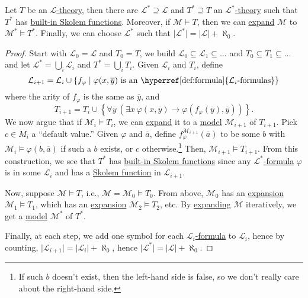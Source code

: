 \begin{lemma}\label{lma:Skolemization}
	Let \(T\) be an \hyperref[def:theory]{\(\mathcal{L} \)-theory}, then there are \(\mathcal{L} ^{\ast} \supseteq \mathcal{L} \) and \(T^{\ast} \supseteq T\) an \hyperref[def:theory]{\(\mathcal{L} ^{\ast} \)-theory} such that \(T^{\ast} \) has \hyperref[def:built-in-Skolem-function]{built-in Skolem functions}. Moreover, if \(\mathcal{M} \models T\), then we can \hyperref[not:expansion]{expand} \(\mathcal{M} \) to \(\mathcal{M} ^{\ast} \models T^{\ast} \). Finally, we can choose \(\mathcal{L} ^{\ast} \) such that \(\vert \mathcal{L} ^{\ast} \vert = \vert \mathcal{L} \vert + \aleph_0\).
\end{lemma}
\begin{proof}
	Start with \(\mathcal{L} _0 = \mathcal{L} \) and \(T_0 = T\), we build \(\mathcal{L} _0 \subseteq \mathcal{L} _1 \subseteq \ldots \) and \(T_0 \subseteq T_1 \subseteq \ldots \) and let \(\mathcal{L} ^{\ast} = \bigcup_{i} \mathcal{L} _i\) and \(T^{\ast} = \bigcup_{i} T_i\). Given \(\mathcal{L} _i\) and \(T_i\), define
	\[
		\mathcal{L} _{i+1} = \mathcal{L} _i \cup \left\{ f_\varphi \mid \varphi (x, \overline{y} ) \text{ is an \hyperref[def:formula]{\(\mathcal{L} _i \)-formulas}} \right\}
	\]
	where the arity of \(f_\varphi \) is the same as \(\overline{y} \), and
	\[
		T_{i+1} = T_i \cup \left\{ \forall \overline{y} \ (\exists x\ \varphi (x, \overline{y} ) \to \varphi (f_\varphi (\overline{y} ) , \overline{y} ) ) \right\}.
	\]
	We now argue that if \(\mathcal{M}_i \models T_i\), we can \hyperref[not:expansion]{expand} it to a \hyperref[def:model]{model} \(\mathcal{M} _{i+1} \) of \(T_{i+1} \). Pick \(c\in M_i\) a ``default value.'' Given \(\varphi \) and \(\overline{a} \), define \(f_\varphi ^{\mathcal{M} _{i+1} }(\overline{a} )\) to be some \(b\) with \(\mathcal{M}_i \models \varphi (b, \overline{a} )\) if such a \(b\) exists, or \(c\) otherwise.\footnote{If such \(b\) doesn't exist, then the left-hand side is false, so we don't really care about the right-hand side.} Then, \(\mathcal{M} _{i+1} \models T_{i+1} \). From this construction, we see that \(T^{\ast} \) has \hyperref[def:built-in-Skolem-function]{built-in Skolem functions} since any \hyperref[def:formula]{\(\mathcal{L}^{\ast}\)-formula} \(\varphi \) is in some \(\mathcal{L} _i\) and has a \hyperref[def:built-in-Skolem-function]{Skolem function} in \(\mathcal{L} _{i+1}\).

	Now, suppose \(\mathcal{M} \models T\), i.e., \(\mathcal{M} = \mathcal{M} _0 \models T_0\). From above, \(\mathcal{M} _0\) has an \hyperref[not:expansion]{expansion} \(\mathcal{M} _1 \models T_1\), which has an \hyperref[not:expansion]{expansion} \(\mathcal{M} _2 \models T_2\), etc. By \hyperref[not:expansion]{expanding} \(\mathcal{M}\) iteratively, we get a \hyperref[def:model]{model} \(\mathcal{M} ^{\ast}\) of \(T^{\ast} \).

	Finally, at each step, we add one symbol for each \hyperref[def:formula]{\(\mathcal{L} _i\)-formula} to \(\mathcal{L} _i\), hence by counting, \(\vert \mathcal{L} _{i+1} \vert = \vert \mathcal{L} _i \vert + \aleph_0\), hence \(\vert \mathcal{L} ^{\ast} \vert = \vert \mathcal{L} \vert + \aleph_0\).
\end{proof}

